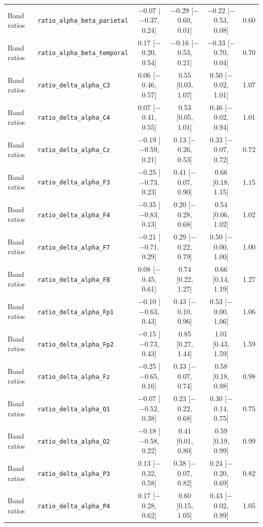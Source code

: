 {\begin{longtable}{llcccc}
Band ratios & \texttt{ratio\_alpha\_beta\_parietal} & $-$0.07 [$-$0.37, 0.24] & $-$0.29 [$-$0.60, 0.01] & $-$0.22 [$-$0.53, 0.08] & 0.60 \\
Band ratios & \texttt{ratio\_alpha\_beta\_temporal} & 0.17 [$-$0.20, 0.54] & $-$0.16 [$-$0.53, 0.21] & $-$0.33 [$-$0.70, 0.04] & 0.70 \\
Band ratios & \texttt{ratio\_delta\_alpha\_C3} & 0.06 [$-$0.46, 0.57] & 0.55 [0.03, 1.07] & 0.50 [$-$0.02, 1.01] & 1.07 \\
Band ratios & \texttt{ratio\_delta\_alpha\_C4} & 0.07 [$-$0.41, 0.55] & 0.53 [0.05, 1.01] & 0.46 [$-$0.02, 0.94] & 1.01 \\
Band ratios & \texttt{ratio\_delta\_alpha\_Cz} & $-$0.19 [$-$0.59, 0.21] & 0.13 [$-$0.26, 0.53] & 0.33 [$-$0.07, 0.72] & 0.72 \\
Band ratios & \texttt{ratio\_delta\_alpha\_F3} & $-$0.25 [$-$0.73, 0.23] & 0.41 [$-$0.07, 0.90] & 0.66 [0.18, 1.15] & 1.15 \\
Band ratios & \texttt{ratio\_delta\_alpha\_F4} & $-$0.35 [$-$0.83, 0.13] & 0.20 [$-$0.28, 0.68] & 0.54 [0.06, 1.02] & 1.02 \\
Band ratios & \texttt{ratio\_delta\_alpha\_F7} & $-$0.21 [$-$0.71, 0.29] & 0.29 [$-$0.22, 0.79] & 0.50 [$-$0.00, 1.00] & 1.00 \\
Band ratios & \texttt{ratio\_delta\_alpha\_F8} & 0.08 [$-$0.45, 0.61] & 0.74 [0.22, 1.27] & 0.66 [0.14, 1.19] & 1.27 \\
Band ratios & \texttt{ratio\_delta\_alpha\_Fp1} & $-$0.10 [$-$0.63, 0.43] & 0.43 [$-$0.10, 0.96] & 0.53 [$-$0.00, 1.06] & 1.06 \\
Band ratios & \texttt{ratio\_delta\_alpha\_Fp2} & $-$0.15 [$-$0.73, 0.43] & 0.85 [0.27, 1.44] & 1.01 [0.43, 1.59] & 1.59 \\
Band ratios & \texttt{ratio\_delta\_alpha\_Fz} & $-$0.25 [$-$0.65, 0.16] & 0.33 [$-$0.07, 0.74] & 0.58 [0.18, 0.98] & 0.98 \\
Band ratios & \texttt{ratio\_delta\_alpha\_O1} & $-$0.07 [$-$0.52, 0.38] & 0.23 [$-$0.22, 0.68] & 0.30 [$-$0.14, 0.75] & 0.75 \\
Band ratios & \texttt{ratio\_delta\_alpha\_O2} & $-$0.18 [$-$0.58, 0.22] & 0.41 [0.01, 0.80] & 0.59 [0.19, 0.99] & 0.99 \\
Band ratios & \texttt{ratio\_delta\_alpha\_P3} & 0.13 [$-$0.32, 0.58] & 0.38 [$-$0.07, 0.82] & 0.24 [$-$0.20, 0.69] & 0.82 \\
Band ratios & \texttt{ratio\_delta\_alpha\_P4} & 0.17 [$-$0.28, 0.62] & 0.60 [0.15, 1.05] & 0.43 [$-$0.02, 0.89] & 1.05 \\

\end{longtable}}
